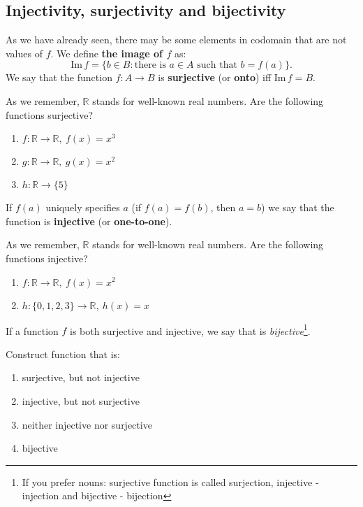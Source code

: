 \subsection{Injectivity, surjectivity and bijectivity}

\noindent As we have already seen, there may be some elements in codomain that are not values of
$f$. We define \textbf{the image of $f$} as:
$$\text{Im}\, f = \{b\in B : \text{there is } a\in A \text{ such that } b=f(a)\}.$$
We say that the function $f: A\to B$ is \textbf{surjective} (or \textbf{onto}) iff $\text{Im}\,f=B$.

\begin{prob}
	As we remember, $\mathbb{R}$ stands for well-known real numbers. Are the following functions surjective?
	\begin{enumerate}
		\item $f: \mathbb{R} \to \mathbb{R}, ~f(x)=x^3$
		\item $g: \mathbb{R} \to \mathbb{R}, ~g(x)=x^2$
		\item $h: \mathbb{R} \to \{5\}$
	\end{enumerate}
\end{prob}

If $f(a)$ uniquely specifies $a$ (if $f(a)=f(b)$, then $a=b$) we say that the function is \textbf{injective}
(or \textbf{one-to-one}).
\begin{prob}
	As we remember, $\mathbb{R}$ stands for well-known real numbers. Are the following functions injective?
	\begin{enumerate}
		\item $f: \mathbb{R} \to \mathbb R, ~f(x)=x^2$
		\item $h: \{0,1,2,3\} \to \mathbb R, ~h(x)=x$
	\end{enumerate}
\end{prob}

If a function $f$ is both surjective and injective, we say that is \textit{bijective}\footnote{If you prefer nouns: surjective function is called surjection, injective - injection
and bijective - bijection}.

\begin{prob}
	Construct function that is:
	\begin{enumerate}
		\item surjective, but not injective
		\item injective, but not surjective
		\item neither injective nor surjective
		\item bijective
	\end{enumerate}
\end{prob}

